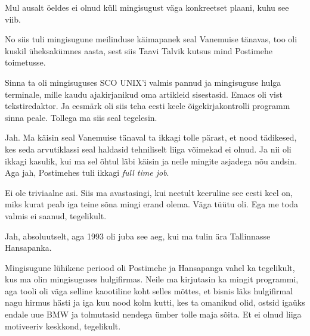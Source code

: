 Mul ausalt öeldes ei olnud küll mingisugust väga konkreetset plaani, kuhu see 
viib.

No siis tuli mingisugune meilinduse käimapanek seal Vanemuise tänavas, too  oli 
kuskil üheksakümnes aasta, sest siis Taavi Talvik 
kutsus mind Postimehe toimetusse.

Sinna ta oli mingisuguses SCO UNIX'i valmis pannud ja 
mingisuguse hulga terminale, mille kaudu ajakirjanikud oma artikleid 
sisestasid. Emacs oli vist tekstiredaktor. Ja eesmärk oli siis teha eesti keele 
õigekirjakontrolli programm sinna peale. Tollega ma siis seal tegelesin. 


Jah. Ma käisin seal Vanemuise tänaval ta ikkagi tolle pärast, et nood 
tädikesed, kes seda arvutiklassi seal haldasid tehniliselt liiga võimekad ei 
olnud. Ja nii oli ikkagi kasulik, kui ma sel õhtul läbi käisin ja neile mingite 
asjadega nõu andsin. Aga jah, Postimehes tuli ikkagi \emph{full time job}.


Ei ole triviaalne asi. Siis ma avastasingi, kui neetult keeruline see eesti 
keel on, miks kurat peab iga teine sõna mingi erand olema. Väga tüütu oli. Ega 
me toda valmis ei saanud, tegelikult.


Jah, absoluutselt, aga  1993 oli juba see aeg, kui ma tulin ära Tallinnasse 
Hansapanka.


Mingisugune lühikene periood oli Postimehe ja Hansapanga vahel ka tegelikult, 
kus ma olin mingisuguses hulgifirmas. Neile ma  kirjutasin ka mingit programmi, 
aga tooli oli väga selline kaootiline koht selles mõttes, et  bisnis läks 
hulgifirmal nagu hirmus hästi ja iga kuu nood kolm kutti, kes ta omanikud olid, 
ostsid igaüks endale uue BMW ja tolmutasid nendega ümber tolle maja sõita. Et 
ei olnud liiga motiveeriv keskkond, tegelikult.

